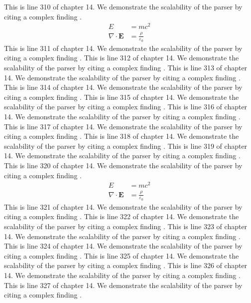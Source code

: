 This is line 310 of chapter 14. We demonstrate the scalability of the parser by citing a complex finding \cite{ref14_310}.
\begin{align*}
  E &= mc^2 \\
  \nabla \cdot \mathbf{E} &= \frac{\rho}{\varepsilon_0}
\end{align*}
This is line 311 of chapter 14. We demonstrate the scalability of the parser by citing a complex finding \cite{ref14_311}.
This is line 312 of chapter 14. We demonstrate the scalability of the parser by citing a complex finding \cite{ref14_312}.
This is line 313 of chapter 14. We demonstrate the scalability of the parser by citing a complex finding \cite{ref14_313}.
This is line 314 of chapter 14. We demonstrate the scalability of the parser by citing a complex finding \cite{ref14_314}.
This is line 315 of chapter 14. We demonstrate the scalability of the parser by citing a complex finding \cite{ref14_315}.
This is line 316 of chapter 14. We demonstrate the scalability of the parser by citing a complex finding \cite{ref14_316}.
This is line 317 of chapter 14. We demonstrate the scalability of the parser by citing a complex finding \cite{ref14_317}.
This is line 318 of chapter 14. We demonstrate the scalability of the parser by citing a complex finding \cite{ref14_318}.
This is line 319 of chapter 14. We demonstrate the scalability of the parser by citing a complex finding \cite{ref14_319}.
This is line 320 of chapter 14. We demonstrate the scalability of the parser by citing a complex finding \cite{ref14_320}.
\begin{align*}
  E &= mc^2 \\
  \nabla \cdot \mathbf{E} &= \frac{\rho}{\varepsilon_0}
\end{align*}
This is line 321 of chapter 14. We demonstrate the scalability of the parser by citing a complex finding \cite{ref14_321}.
This is line 322 of chapter 14. We demonstrate the scalability of the parser by citing a complex finding \cite{ref14_322}.
This is line 323 of chapter 14. We demonstrate the scalability of the parser by citing a complex finding \cite{ref14_323}.
This is line 324 of chapter 14. We demonstrate the scalability of the parser by citing a complex finding \cite{ref14_324}.
This is line 325 of chapter 14. We demonstrate the scalability of the parser by citing a complex finding \cite{ref14_325}.
This is line 326 of chapter 14. We demonstrate the scalability of the parser by citing a complex finding \cite{ref14_326}.
This is line 327 of chapter 14. We demonstrate the scalability of the parser by citing a complex finding \cite{ref14_327}.
